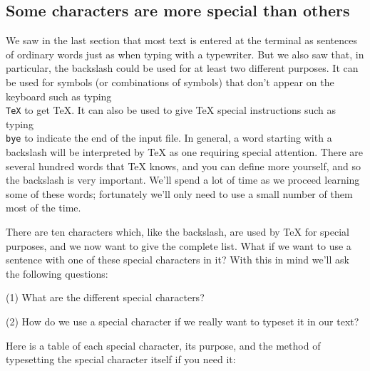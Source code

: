 \subsection{Some characters are more special than others} 
 
We saw in the last section that most text is entered at the 
terminal as sentences of ordinary words just as when typing with 
a typewriter. But we also saw that, in particular, the backslash 
could be used for at least two different purposes. It can be 
used for symbols (or combinations of symbols) that don't appear 
on the keyboard such as typing {\tt \\TeX} to get \TeX\null. It 
can also be used to give \TeX{} special instructions such as 
typing {\tt \\bye} to indicate the end of the input file. In 
general, a word starting with a backslash will be interpreted by 
\TeX{} as one requiring special attention. There are several 
hundred words that \TeX{} knows, and you can define more 
yourself, and so the backslash is very important. We'll spend a 
lot of time as we proceed learning some of these words; 
fortunately we'll only need to use a small number of them most of 
the time. 
 
There are ten characters which, like the backslash, are used 
by \TeX{} for special purposes, and we now want to give the 
complete list. 
What if we want to use a sentence with one of these 
special characters in it? With this in mind we'll ask the following 
questions: 
\item{(1)} What are the different special characters? 
\item{(2)} How do we use a special character if we really want to 
typeset it in our text? 
 
Here is a table of each special character, its purpose, and the 
method of typesetting the special character itself if you need 
it: 
 
 
 
